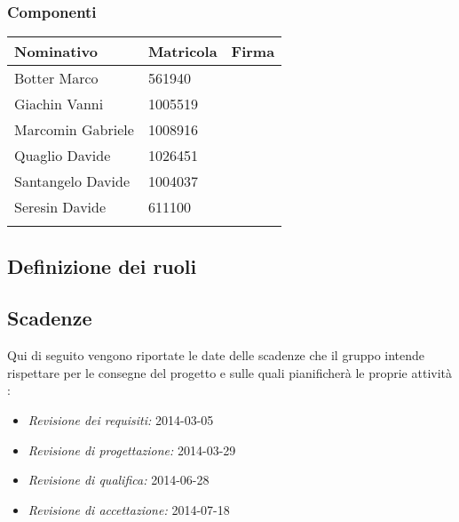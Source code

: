 \subsubsection{Componenti}
\begin{center}
\begin{tabular}{l l l}
\hline
Nominativo & Matricola & Firma\\
\hline
Botter Marco & 561940 & \\ %
\hline
Giachin Vanni & 1005519 & \\ %
\hline
Marcomin Gabriele & 1008916 & \\ %
\hline
Quaglio Davide & 1026451 &  \\ %
\hline
Santangelo Davide & 1004037 & \\ %
\hline
Seresin Davide & 611100 & \\ %
\hline
\\
\end{tabular}
\end{center}
\subsection{Definizione dei ruoli}

\subsection{Scadenze}
\label{subsec:Scadenze}
Qui di seguito vengono riportate le date delle scadenze che il gruppo \gruppo intende rispettare per le consegne del progetto e sulle quali pianificherà le proprie attività :
\begin{itemize}
	\item \textit{Revisione dei requisiti: }2014-03-05
	\item \textit{Revisione di progettazione: }2014-03-29
	\item \textit{Revisione di qualifica: }2014-06-28
	\item \textit{Revisione di accettazione: }2014-07-18
\end{itemize}
